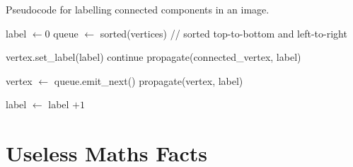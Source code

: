 \documentclass[11pt]{amsart}
\begin{document}
\begin{algorithm}
\caption{Pseudocode for labelling connected components in an image.}
\label{alg:labelling}
\begin{algorithmic}[1]

\State label $\leftarrow 0$
\State queue $\leftarrow$ sorted(vertices) // sorted top-to-bottom and left-to-right

\State vertex.set\_label(label)
\State continue
\Else
\State propagate(connected\_vertex, label)
\EndIf
\EndFor
\EndProcedure

\State vertex $\leftarrow$ queue.emit\_next()
\State propagate(vertex, label)

\State label $\leftarrow$ label $+ 1$

\EndWhile

\end{algorithmic}
\end{algorithm}

\section{Useless Maths Facts}
\end{document}

